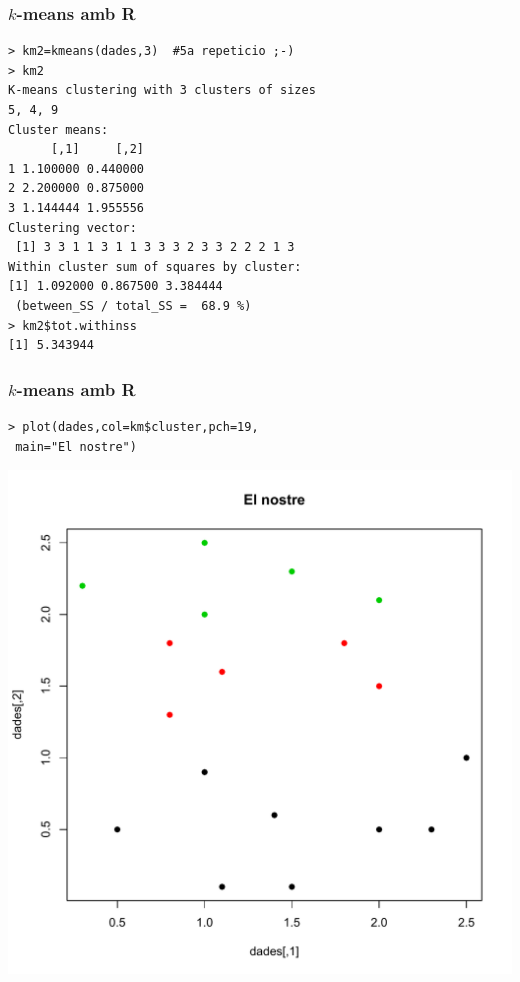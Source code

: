 \documentclass[12pt,t]{beamer}
\theoremstyle{plain}
\theoremstyle{definition}
\begin{document}
\begin{frame}[fragile]
\frametitle{$k$-means amb R}
\vspace*{-2ex}

 
\begin{verbatim}
> km2=kmeans(dades,3)  #5a repeticio ;-) 
> km2
K-means clustering with 3 clusters of sizes
5, 4, 9
Cluster means:
      [,1]     [,2]
1 1.100000 0.440000
2 2.200000 0.875000
3 1.144444 1.955556
Clustering vector:
 [1] 3 3 1 1 3 1 1 3 3 3 2 3 3 2 2 2 1 3
Within cluster sum of squares by cluster:
[1] 1.092000 0.867500 3.384444
 (between_SS / total_SS =  68.9 %)
> km2$tot.withinss
[1] 5.343944
\end{verbatim}
\end{frame}





\begin{frame}[fragile]
\frametitle{$k$-means amb R}
\footnotesize
\begin{verbatim}
> plot(dades,col=km$cluster,pch=19,
 main="El nostre")
\end{verbatim}
\vspace*{-3ex}

\begin{center}
\includegraphics[width=0.7 \linewidth]{Rplot5.pdf}
\end{center}

\end{frame}
\end{document}
